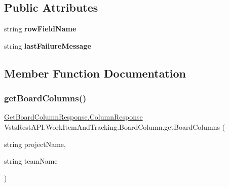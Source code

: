 \subsection*{Public Attributes}
\begin{DoxyCompactItemize}
\item 
\mbox{\label{class_vsts_rest_a_p_i_1_1_work_item_and_tracking_1_1_board_column_a3cfcdf88f7e8575e5fe3d3b651fc9ad2}} 
string {\bfseries row\+Field\+Name}
\item 
\mbox{\label{class_vsts_rest_a_p_i_1_1_work_item_and_tracking_1_1_board_column_ab1d9f3b47971e0dcdca9145c450a72d9}} 
string {\bfseries last\+Failure\+Message}
\end{DoxyCompactItemize}


\subsection{Member Function Documentation}
\mbox{\label{class_vsts_rest_a_p_i_1_1_work_item_and_tracking_1_1_board_column_ab37fe206629cd139eeb2e6c634e56859}} 
\subsubsection{\texorpdfstring{get\+Board\+Columns()}{getBoardColumns()}}
{\footnotesize\ttfamily \mbox{\hyperlink{class_vsts_rest_a_p_i_1_1_viewmodel_1_1_work_item_1_1_get_board_column_response_1_1_column_response}{Get\+Board\+Column\+Response.\+Column\+Response}} Vsts\+Rest\+A\+P\+I.\+Work\+Item\+And\+Tracking.\+Board\+Column.\+get\+Board\+Columns (\begin{DoxyParamCaption}\item[{string}]{project\+Name,  }\item[{string}]{team\+Name }\end{DoxyParamCaption})}



